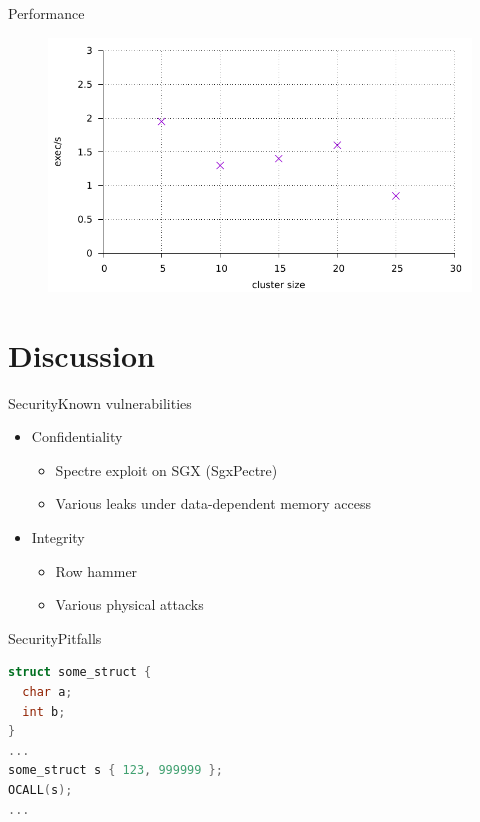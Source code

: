 \documentclass{beamer}
\begin{document}
\begin{frame}{Performance}%
  \begin{figure}[p]
    \includegraphics[width=\textwidth]{figures/d200/d200.pdf}
  \end{figure}
\end{frame}

\section{Discussion}

\begin{frame}{Security}{Known vulnerabilities}%
  \begin{itemize}
    \item Confidentiality
    \begin{itemize}
      \item Spectre exploit on SGX (SgxPectre)
      \item Various leaks under data-dependent memory access
    \end{itemize}

    \vfill

    \item Integrity
    \begin{itemize}
      \item Row hammer
      \item Various physical attacks
    \end{itemize}
  \end{itemize}
\end{frame}

\begin{frame}[fragile]{Security}{Pitfalls}%
  \vfill
  \begin{lstlisting}[language=C, basicstyle=\footnotesize\ttfamily, keywordstyle=\color{mLightBrown}]
struct some_struct {
  char a;
  int b;
}
...
some_struct s { 123, 999999 };
OCALL(s);
...
  \end{lstlisting}
  \vfill
\end{frame}
\end{document}
